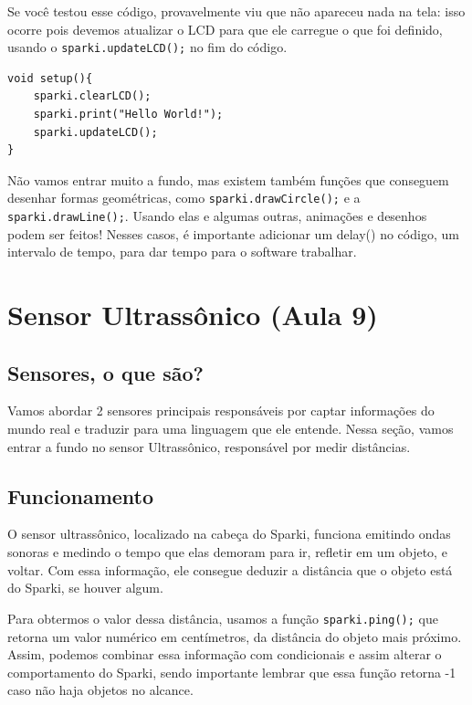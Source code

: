 \documentclass[conference]{IEEEtran}
\begin{document}
Se você testou esse código, provavelmente viu que não apareceu nada na tela: isso ocorre pois devemos atualizar o LCD para que ele carregue o que foi definido, usando o \texttt{sparki.updateLCD();} no fim do código.

\begin{lstlisting}[caption={Algoritmo corrigido e funcional}]
void setup(){
    sparki.clearLCD();
    sparki.print("Hello World!");
    sparki.updateLCD();
}
\end{lstlisting}

Não vamos entrar muito a fundo, mas existem também funções que conseguem desenhar formas geométricas, como \texttt{sparki.drawCircle();} e a \texttt{sparki.drawLine();}. Usando elas e algumas outras, animações e desenhos podem ser feitos! Nesses casos, é importante adicionar um delay() no código, um intervalo de tempo, para dar tempo para o software trabalhar.

\vspace{0.5cm}
\section{Sensor Ultrassônico (Aula 9)}
\subsection{Sensores, o que são?}
Vamos abordar 2 sensores principais responsáveis por captar informações do mundo real e traduzir para uma linguagem que ele entende. Nessa seção, vamos entrar a fundo no sensor Ultrassônico, responsável por medir distâncias.
\subsection{Funcionamento}
O sensor ultrassônico, localizado na cabeça do Sparki, funciona emitindo ondas sonoras e medindo o tempo que elas demoram para ir, refletir em um objeto, e voltar. Com essa informação, ele consegue deduzir a distância que o objeto está do Sparki, se houver algum.

Para obtermos o valor dessa distância, usamos a função \texttt{sparki.ping();} que retorna um valor numérico em centímetros, da distância do objeto mais próximo. Assim, podemos combinar essa informação com condicionais e assim alterar o comportamento do Sparki, sendo importante lembrar que essa função retorna -1 caso não haja objetos no alcance. 

\vspace{0.5cm}
\end{document}
